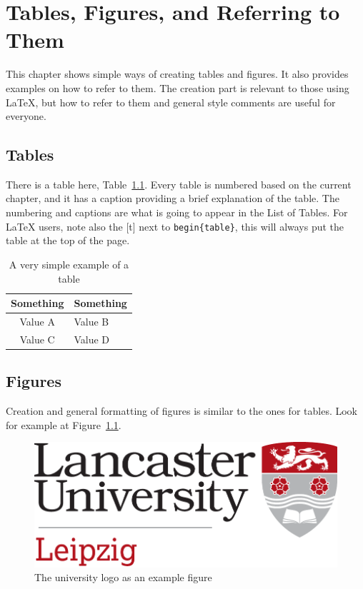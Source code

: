 \chapter{Tables, Figures, and Referring to Them} \label{cha:chapter2}


This chapter shows simple ways of creating tables and figures. It also
provides examples on how to refer to them. The creation part is
relevant to those using \LaTeX{}, but how to refer to them and general
style comments are useful for everyone.

\section{Tables} \label{sec:chap2:tables}

There is a table here, Table~\ref{tab:table1}. Every table is numbered
based on the current chapter, and it has a caption providing a brief
explanation of the table. The numbering and captions are what is going
to appear in the List of Tables. For \LaTeX{} users, note also the [t]
next to {\tt begin\{table\}}, this will always put the table at the
top of the page.

\begin{table}[t]
  \centering
  \begin{tabular}{| c | l |}
    \hline
    {\bf Something} & \textbf{Something}\\
    \hline
    \hline
    Value A & Value B\\
    \hline
    Value C & Value D\\
    \hline
  \end{tabular}
  \caption{A very simple example of a table}
  \label{tab:table1}
\end{table}


\section{Figures}
\label{sec:chap2:figures}

Creation and general formatting of figures is similar to the ones for
tables. Look for example at Figure~\ref{fig:example1}.

\begin{figure}[t]
  \centering
  \includegraphics[width=.4\linewidth]{lancaster-university-leipzig-logo}
  \caption{The university logo as an example figure}
  \label{fig:example1}
\end{figure}


